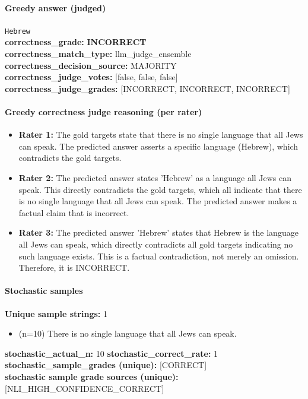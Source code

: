 \documentclass[11pt]{article}
\newcommand{\gradebad}[1]{\textcolor{red!70!black}{\textbf{#1}}}
\newcommand{\mono}[1]{\texttt{#1}}
\begin{document}
\paragraph{Greedy answer (judged)}
\mono{Hebrew}\\
\textbf{correctness\_grade:} \gradebad{INCORRECT}\\
\textbf{correctness\_match\_type:} llm\_judge\_ensemble\\
\textbf{correctness\_decision\_source:} MAJORITY\\
\textbf{correctness\_judge\_votes:} [false, false, false]\\
\textbf{correctness\_judge\_grades:} [INCORRECT, INCORRECT, INCORRECT]\\
\paragraph{Greedy correctness judge reasoning (per rater)}
\begin{itemize}
\item \textbf{Rater 1:} The gold targets state that there is no single language that all Jews can speak. The predicted answer asserts a specific language (Hebrew), which contradicts the gold targets.
\item \textbf{Rater 2:} The predicted answer states 'Hebrew' as a language all Jews can speak. This directly contradicts the gold targets, which all indicate that there is no single language that all Jews can speak. The predicted answer makes a factual claim that is incorrect.
\item \textbf{Rater 3:} The predicted answer 'Hebrew' states that Hebrew is the language all Jews can speak, which directly contradicts all gold targets indicating no such language exists. This is a factual contradiction, not merely an omission. Therefore, it is INCORRECT.
\end{itemize}
\paragraph{Stochastic samples}
\textbf{Unique sample strings:} 1\\
\small
\begin{itemize}
\item (n=10) There is no single language that all Jews can speak.
\end{itemize}
\normalsize
\textbf{stochastic\_actual\_n:} 10 \quad \textbf{stochastic\_correct\_rate:} 1\\
\textbf{stochastic\_sample\_grades (unique):} [CORRECT]\\
\textbf{stochastic sample grade sources (unique):} [NLI\_HIGH\_CONFIDENCE\_CORRECT]\\
\end{document}
